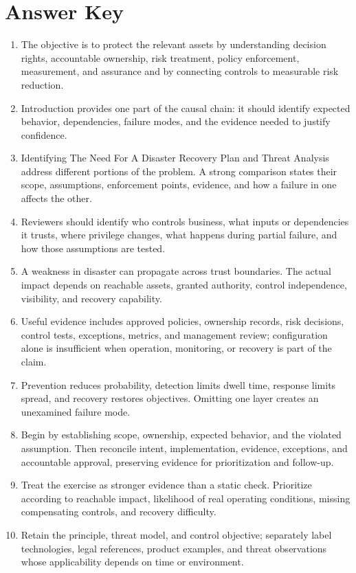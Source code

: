 \documentclass[11pt,letterpaper]{article}
\begin{document}
\section*{Answer Key}
\begin{enumerate}
\item The objective is to protect the relevant assets by understanding decision rights, accountable ownership, risk treatment, policy enforcement, measurement, and assurance and by connecting controls to measurable risk reduction.
\item Introduction provides one part of the causal chain: it should identify expected behavior, dependencies, failure modes, and the evidence needed to justify confidence.
\item Identifying The Need For A Disaster Recovery Plan and Threat Analysis address different portions of the problem. A strong comparison states their scope, assumptions, enforcement points, evidence, and how a failure in one affects the other.
\item Reviewers should identify who controls business, what inputs or dependencies it trusts, where privilege changes, what happens during partial failure, and how those assumptions are tested.
\item A weakness in disaster can propagate across trust boundaries. The actual impact depends on reachable assets, granted authority, control independence, visibility, and recovery capability.
\item Useful evidence includes approved policies, ownership records, risk decisions, control tests, exceptions, metrics, and management review; configuration alone is insufficient when operation, monitoring, or recovery is part of the claim.
\item Prevention reduces probability, detection limits dwell time, response limits spread, and recovery restores objectives. Omitting one layer creates an unexamined failure mode.
\item Begin by establishing scope, ownership, expected behavior, and the violated assumption. Then reconcile intent, implementation, evidence, exceptions, and accountable approval, preserving evidence for prioritization and follow-up.
\item Treat the exercise as stronger evidence than a static check. Prioritize according to reachable impact, likelihood of real operating conditions, missing compensating controls, and recovery difficulty.
\item Retain the principle, threat model, and control objective; separately label technologies, legal references, product examples, and threat observations whose applicability depends on time or environment.
\end{enumerate}
\end{document}

